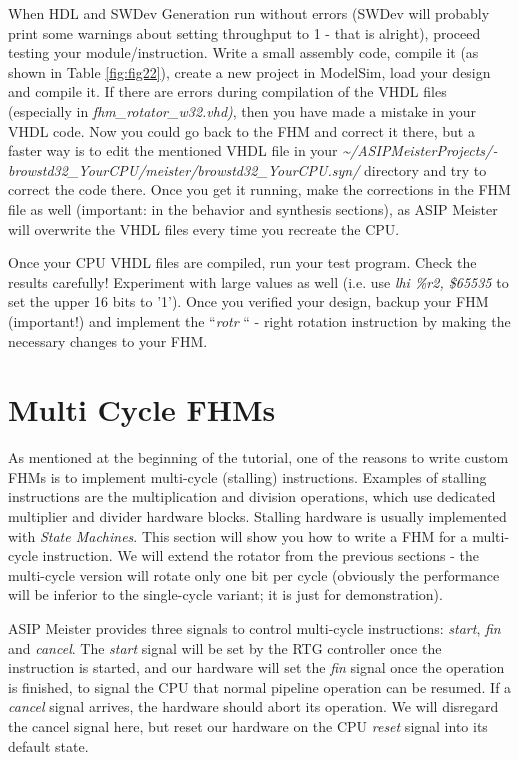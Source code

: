 When HDL and SWDev Generation run without errors (SWDev will probably
print some warnings about setting throughput to 1 - that is alright),
proceed testing your module/instruction. Write a small assembly code,
compile it (as shown in Table \ref{fig:fig22}), create a
new project in ModelSim, load your design and compile it. If there are
errors during compilation of the VHDL files (especially in
\emph{fhm\_rotator\_w32.vhd)}, then you have made a mistake in your VHDL
code. Now you could go back to the FHM and correct it there, but a
faster way is to edit the mentioned VHDL file in your
\emph{\textasciitilde/ASIPMeisterProjects/­browstd32\_YourCPU/­meister/­browstd32\_YourCPU.syn/}
directory and try to correct the code there. Once you get it running,
make the corrections in the FHM file as well (important: in the behavior
{and} synthesis sections), as ASIP Meister will overwrite the VHDL files
every time you recreate the CPU.

Once your CPU VHDL files are compiled, run your test program. Check the
results carefully! Experiment with large values as well (i.e. use
\emph{lhi \%r2, \$65535} to set the upper 16 bits to '1'). Once you
verified your design, backup your FHM (important!) and implement the
``\emph{rotr} `` - right rotation instruction by making the necessary
changes to your FHM.

\hypertarget{multi-cycle-fhms}{%
\section{Multi Cycle FHMs}\label{multi-cycle-fhms}}

As mentioned at the beginning of the tutorial, one of the reasons to
write custom FHMs is to implement multi-cycle (stalling) instructions.
Examples of stalling instructions are the multiplication and division
operations, which use dedicated multiplier and divider hardware blocks.
Stalling hardware is usually implemented with \emph{State Machines}.
This section will show you how to write a FHM for a multi-cycle
instruction. We will extend the rotator from the previous sections - the
multi-cycle version will rotate only one bit per cycle (obviously the
performance will be inferior to the single-cycle variant; it is just for
demonstration).

ASIP Meister provides three signals to control multi-cycle instructions:
\emph{start}, \emph{fin} and \emph{cancel}. The \emph{start} signal will
be set by the RTG controller once the instruction is started, and our
hardware will set the \emph{fin} signal once the operation is finished,
to signal the CPU that normal pipeline operation can be resumed. If a
\emph{cancel} signal arrives, the hardware should abort its operation.
We will disregard the cancel signal here, but reset our hardware on the
CPU \emph{reset} signal into its default state.


